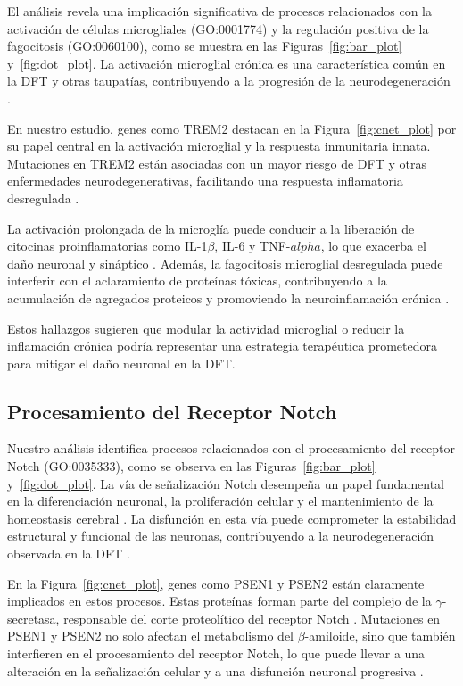 El análisis revela una implicación significativa de procesos relacionados con la activación de células microgliales (GO:0001774) y la regulación positiva de la fagocitosis (GO:0060100), como se muestra en las Figuras~\ref{fig:bar_plot} y~\ref{fig:dot_plot}. La activación microglial crónica es una característica común en la DFT y otras taupatías, contribuyendo a la progresión de la neurodegeneración \cite{heneka2015neuroinflammation, rajendran2009microglia}.

En nuestro estudio, genes como TREM2 destacan en la Figura~\ref{fig:cnet_plot} por su papel central en la activación microglial y la respuesta inmunitaria innata. Mutaciones en TREM2 están asociadas con un mayor riesgo de DFT y otras enfermedades neurodegenerativas, facilitando una respuesta inflamatoria desregulada \cite{yeh2016trem2, ulland2017trem2}.

La activación prolongada de la microglía puede conducir a la liberación de citocinas proinflamatorias como IL-1\(\beta\), IL-6 y TNF-\(alpha\), lo que exacerba el daño neuronal y sináptico \cite{block2007microglia}. Además, la fagocitosis microglial desregulada puede interferir con el aclaramiento de proteínas tóxicas, contribuyendo a la acumulación de agregados proteicos y promoviendo la neuroinflamación crónica \cite{lull2010microglial}.

Estos hallazgos sugieren que modular la actividad microglial o reducir la inflamación crónica podría representar una estrategia terapéutica prometedora para mitigar el daño neuronal en la DFT.


\subsection{Procesamiento del Receptor Notch}

Nuestro análisis identifica procesos relacionados con el procesamiento del receptor Notch (GO:0035333), como se observa en las Figuras~\ref{fig:bar_plot} y~\ref{fig:dot_plot}. La vía de señalización Notch desempeña un papel fundamental en la diferenciación neuronal, la proliferación celular y el mantenimiento de la homeostasis cerebral \cite{kopan2009canonical}. La disfunción en esta vía puede comprometer la estabilidad estructural y funcional de las neuronas, contribuyendo a la neurodegeneración observada en la DFT \cite{abbott2019notch}.

En la Figura~\ref{fig:cnet_plot}, genes como PSEN1 y PSEN2 están claramente implicados en estos procesos. Estas proteínas forman parte del complejo de la  \(\gamma\)-secretasa, responsable del corte proteolítico del receptor Notch \cite{de2002presenilins}. Mutaciones en PSEN1 y PSEN2 no solo afectan el metabolismo del \(\beta\)-amiloide, sino que también interfieren en el procesamiento del receptor Notch, lo que puede llevar a una alteración en la señalización celular y a una disfunción neuronal progresiva \cite{sherrington1995cloning}.

